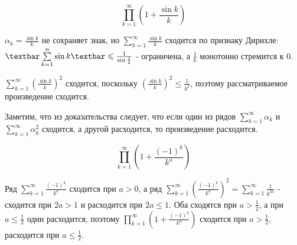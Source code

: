 \documentclass[../../main.tex]{subfiles}
\begin{document}
	\begin{example}
		\[\prod\limits_{k = 1}^{\infty} \left(1 + \frac{\sin k}{k}\right)\]
		
		$\alpha_k = \frac{\sin k}{k}$ не сохраняет знак, но $\sum\limits_{k = 1}^{\infty} \frac{\sin k}{k}$ сходится по признаку Дирихле: $\textbar \sum\limits_{k = 1}^{n} \sin k \textbar \leq \frac{1}{\sin \frac{1}{2}}$ - ограничена, а $\frac{1}{k}$ монотонно стремится к 0.
		
		$\sum\limits_{k = 1}^{\infty} \left(\frac{\sin k}{k}\right)^2$ сходится, поскольку $\left(\frac{\sin k}{k}\right)^2 \leq \frac{1}{k^2}$, поэтому рассматриваемое произведение сходится.
	\end{example}

	Заметим, что из доказательства следует, что если один из рядов $\sum\limits_{k = 1}^{\infty} \alpha_k$ и $\sum\limits_{k = 1}^{\infty} \alpha_k^2$ сходится, а другой расходится, то произведение расходится.
	
	\begin{example}
		\[\prod\limits_{k = 1}^{\infty} \left(1 + \frac{(-1)^k}{k^a}\right)\]
		
		Ряд $\sum\limits_{k = 1}^{\infty} \frac{(-1)^k}{k^a}$ сходится при $a > 0$, а ряд $\sum\limits_{k = 1}^{\infty} \left(\frac{(-1)^k}{k^a}\right)^2 = \sum\limits_{k = 1}^{\infty} \frac{1}{k^{2a}}$ - сходится при $2a > 1$ и расходится при $2a \leq 1$. Оба сходятся при $a > \frac{1}{2}$, а при $a \leq \frac{1}{2}$ один расходится, поэтому $\prod\limits_{k = 1}^{\infty} \left(1 + \frac{(-1)^k}{k^a}\right)$ сходится при $a > \frac{1}{2}$, расходится при $a \leq \frac{1}{2}$.
	\end{example}
	
\end{document}
